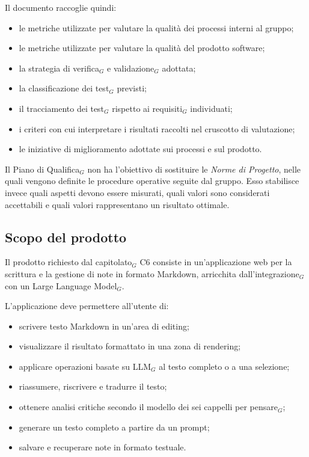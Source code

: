 \documentclass[a4paper, 10pt, colorlinks=true, linkcolor=black, urlcolor=blue, citecolor=blue, hidelinks]{article}
\begin{document}
Il documento raccoglie quindi:
\begin{itemize}
    \item le metriche utilizzate per valutare la qualità dei processi interni al gruppo;
    \item le metriche utilizzate per valutare la qualità del prodotto software;
    \item la strategia di verifica$_G$ e validazione$_G$ adottata;
    \item la classificazione dei test$_G$ previsti;
    \item il tracciamento dei test$_G$ rispetto ai requisiti$_G$ individuati;
    \item i criteri con cui interpretare i risultati raccolti nel cruscotto di valutazione;
    \item le iniziative di miglioramento adottate sui processi e sul prodotto.
\end{itemize}

Il Piano di Qualifica$_G$ non ha l'obiettivo di sostituire le \textit{Norme di Progetto}, nelle quali vengono definite le procedure operative seguite dal gruppo. Esso stabilisce invece quali aspetti devono essere misurati, quali valori sono considerati accettabili e quali valori rappresentano un risultato ottimale.

\subsection{Scopo del prodotto}

Il prodotto richiesto dal capitolato$_G$ C6 consiste in un'applicazione web per la scrittura e la gestione di note in formato Markdown, arricchita dall'integrazione$_G$ con un Large Language Model$_G$.

L'applicazione deve permettere all'utente di:
\begin{itemize}
    \item scrivere testo Markdown in un'area di editing;
    \item visualizzare il risultato formattato in una zona di rendering;
    \item applicare operazioni basate su LLM$_G$ al testo completo o a una selezione;
    \item riassumere, riscrivere e tradurre il testo;
    \item ottenere analisi critiche secondo il modello dei sei cappelli per pensare$_G$;
    \item generare un testo completo a partire da un prompt;
    \item salvare e recuperare note in formato testuale.
\end{itemize}
\end{document}
